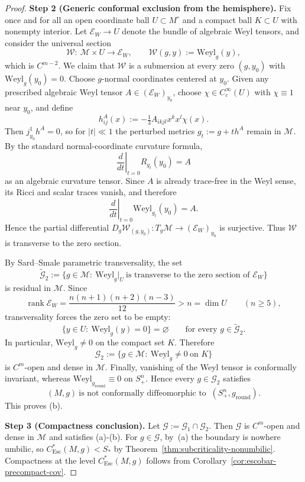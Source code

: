 \documentclass[11pt,reqno,a4paper]{amsart}
\numberwithin{equation}{section}
\theoremstyle{plain}
\newcommand{\Esc}{\ensuremath{\mathrm{Esc}}}
\theoremstyle{remark}
\theoremstyle{plain}
\begin{document}
\begin{proof}
\medskip\noindent
\textbf{Step 2 (Generic conformal exclusion from the hemisphere).}
Fix once and for all an open coordinate ball $U\subset M^\circ$ and a compact ball
$K\subset U$ with nonempty interior. Let $\mathcal E_W\to U$ denote the bundle of
algebraic Weyl tensors, and consider the universal section
\[
\mathcal W:\ \mathcal M\times U\longrightarrow \mathcal E_W,
\qquad
\mathcal W(g,y):=\mathrm{Weyl}_g(y),
\]
which is $C^{m-2}$.
We claim that $\mathcal W$ is a submersion at every zero $(g,y_0)$ with
$\mathrm{Weyl}_g(y_0)=0$. Choose $g$-normal coordinates centered at $y_0$.
Given any prescribed algebraic Weyl tensor $A\in(\mathcal E_W)_{y_0}$, choose
$\chi\in C_c^\infty(U)$ with $\chi\equiv1$ near $y_0$, and define
\[
  h^A_{ij}(x):=-\tfrac13 A_{ikjl}x^k x^l\chi(x).
\]
Then $j^1_{y_0}h^A=0$, so for $|t|\ll1$ the perturbed metrics $g_t:=g+t h^A$ remain in
$\mathcal M$. By the standard normal-coordinate curvature formula,
\[
  \left.\frac{d}{dt}\right|_{t=0}R_{g_t}(y_0)=A
\]
as an algebraic curvature tensor. Since $A$ is already trace-free in the Weyl sense,
its Ricci and scalar traces vanish, and therefore
\[
  \left.\frac{d}{dt}\right|_{t=0}\mathrm{Weyl}_{g_t}(y_0)=A.
\]
Hence the partial differential
$D_g\mathcal W_{(g,y_0)}:T_g\mathcal M\to(\mathcal E_W)_{y_0}$ is surjective.
Thus $\mathcal W$ is transverse to the zero section.

By Sard--Smale parametric transversality, the set
\[
\widetilde{\mathcal G}_2
:=\Big\{g\in\mathcal M:\ \mathrm{Weyl}_g|_U
\ \text{is transverse to the zero section of }\mathcal E_W\Big\}
\]
is residual in $\mathcal M$. Since
\[
\operatorname{rank}\mathcal E_W
=\frac{n(n+1)(n+2)(n-3)}{12}
>n=\dim U
\qquad(n\ge5),
\]
transversality forces the zero set to be empty:
\[
\{y\in U:\ \mathrm{Weyl}_g(y)=0\}=\varnothing
\qquad\text{for every }g\in\widetilde{\mathcal G}_2.
\]
In particular, $\mathrm{Weyl}_g\neq0$ on the compact set $K$. Therefore
\[
\mathcal G_2
:=\Big\{g\in\mathcal M:\ \mathrm{Weyl}_g\neq0\ \text{on }K\Big\}
\]
is $C^m$-open and dense in $\mathcal M$.
Finally, vanishing of the Weyl tensor is conformally invariant, whereas
$\mathrm{Weyl}_{g_{\mathrm{round}}}\equiv0$ on $S^n_+$. Hence every $g\in\mathcal G_2$
satisfies
\[
(M,g)\ \text{is not conformally diffeomorphic to }\ (S^n_+,g_{\mathrm{round}}).
\]
This proves \textup{(b)}.

\medskip\noindent
\textbf{Step 3 (Compactness conclusion).}
Let $\mathcal G:=\mathcal G_1\cap\mathcal G_2$.
Then $\mathcal G$ is $C^m$-open and dense in $\mathcal M$ and satisfies
\textup{(a)}-\textup{(b)}.
For $g\in\mathcal G$, by~\textup{(a)} the boundary is nowhere umbilic, so
$C^*_{\Esc}(M,g)<S_\ast$ by
Theorem~\ref{thm:subcriticality-nonumbilic}.
Compactness at the level $C^*_{\Esc}(M,g)$ follows
from Corollary~\ref{cor:escobar-precompact-cov}.
\end{proof}
\end{document}
